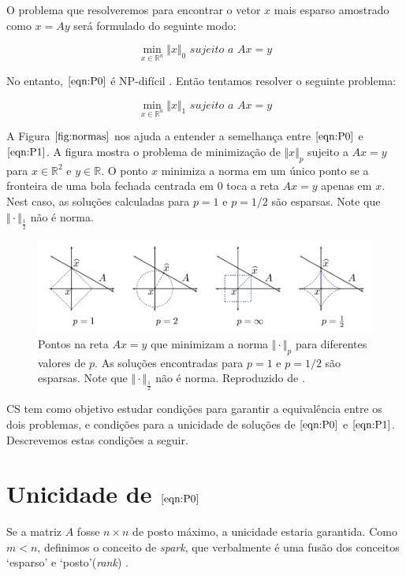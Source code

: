O problema que resolveremos para encontrar o vetor $x$ mais esparso amostrado como $x = Ay$ será formulado do seguinte modo:

\begin{equation}
\tag{$P_0$}
\min_{x \in \mathbb{R}^n} \Vert x \Vert_{0} \textit{ sujeito a } Ax = y
\label{eqn:P0}
\end{equation}

No entanto, $\eqref{eqn:P0}$ é NP-difícil \cite{fourau}. Então tentamos resolver o seguinte problema:

\begin{equation}
\tag{$P_1$}
\min_{x \in \mathbb{R}^n} \Vert x \Vert_{1} \textit{ sujeito a } Ax = y
\label{eqn:P1}
\end{equation}

A Figura $\ref{fig:normas}$ nos ajuda a entender a semelhança entre $\eqref{eqn:P0}$ e $\eqref{eqn:P1}$. A figura mostra o problema de minimização de $\Vert x \Vert_p$ sujeito a $Ax = y$ para $x \in \mathbb{R}^2$ e $y \in \mathbb{R}$. O ponto $x$ minimiza a norma em um único ponto se a fronteira de uma bola fechada centrada em $0$ toca a reta $Ax = y$ apenas em $x$. Nest caso, as soluções calculadas para $p = 1$ e $p = 1/2$ são esparsas. Note que $\Vert \cdot \Vert_{\frac{1}{2}}$ não é norma.

\begin{figure}
\centering
\includegraphics[scale=.6]{imagens/normas.png}
\caption{Pontos na reta $Ax = y$ que minimizam a norma $\Vert \cdot \Vert_p$ para diferentes valores de $p$. As soluções encontradas para $p = 1$ e $p = 1/2$ são esparsas. Note que $\Vert \cdot \Vert_{\frac{1}{2}}$ não é norma. Reproduzido de \cite{ddek}.}
\label{fig:normas}
\end{figure}

CS tem como objetivo estudar condições para garantir a equivalência entre os dois problemas, e condições para a unicidade de soluções de $\eqref{eqn:P0}$ e $\eqref{eqn:P1}$. Descrevemos estas condições a seguir.

\section{Unicidade de $\eqref{eqn:P0}$}
Se a matriz $A$ fosse $n \times n$ de posto máximo, a unicidade estaria garantida. Como $m < n$, definimos o conceito de \textit{spark}, que verbalmente é uma fusão dos conceitos `esparso' e `posto'(\textit{rank}) \cite{kutyniok}.

